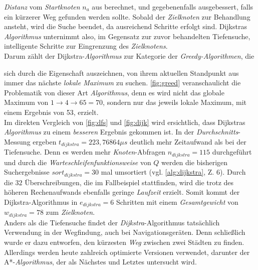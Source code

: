 \documentclass[12pt]{article}
\begin{document}
\noindent \textit{Distanz} vom \textit{Startknoten} $n_a$ aus berechnet, und gegebenenfalls ausgebessert, falls ein kürzerer Weg gefunden werden sollte. Sobald der \textit{Zielknoten} zur Behandlung ansteht, wird die Suche beendet, da ausreichend Schritte erfolgt sind. Dijkstras \textit{Algorithmus} unternimmt also, im Gegensatz zur zuvor behandelten Tiefensuche, intelligente Schritte zur Eingrenzung des \textit{Zielknotens}. 
\\
Darum zählt der Dijkstra-\textit{Algorithmus} zur Kategorie der \textit{Greedy-Algorithmen}, die

\noindent sich durch die Eigenschaft auszeichnen, von ihrem aktuellen Standpunkt aus immer das  nächste \textit{lokale Maximum} zu suchen. \autoref{fig:greed} veranschaulicht die Problematik von dieser Art \textit{Algorithmus}, denn es wird nicht das globale Maximum von $1 \to 4 \to 65 = 70$, sondern nur das jeweils lokale Maximum, mit einem Ergebnis von 53, erzielt.
\\
Im direkten Vergleich von \autoref{fig:dfs} und \autoref{fig:dijk} wird ersichtlich, dass Dijkstras \textit{Algorithmus} zu einem \textit{besseren} Ergebnis gekommen ist. In der \textit{Durchschnitts}-Messung ergeben $t_{dijkstra} = 223,76864\mu s$ deutlich mehr Zeitaufwand als bei der Tiefensuche. Denn es werden mehr \textit{Knoten}-Abfragen $n_{dijkstra} = 115$ durchgeführt und durch die \textit{Warteschleifenfunktionsweise} von $Q$ werden die bisherigen Suchergebnisse $sort_{dijkstra} = 30$ mal umsortiert (vgl. \autoref{alg:dijkstra}, Z. 6). Durch die $32$ Überschreibungen, die im Fallbeispiel stattfinden, wird die trotz des höheren Rechenaufwands ebenfalls geringe \textit{Laufzeit} erzielt. Somit kommt der Dijkstra-Algorithmus in $e_{dijkstra} = 6$ Schritten mit einem \textit{Gesamtgewicht} von $w_{dijkstra} = 78$ zum \textit{Zielknoten}.
\\
Anders als die Tiefensuche findet der \textit{Dijkstra}-Algorithmus tatsächlich Verwendung in der Wegfindung, auch bei Navigationsgeräten. Denn schließlich wurde er dazu entworfen, den kürzesten \textit{Weg} zwischen zwei Städten zu finden. Allerdings werden heute zahlreich optimierte Versionen verwendet, darunter der A*-\textit{Algorithmus}, der als Nächstes und Letztes untersucht wird.
\end{document}
